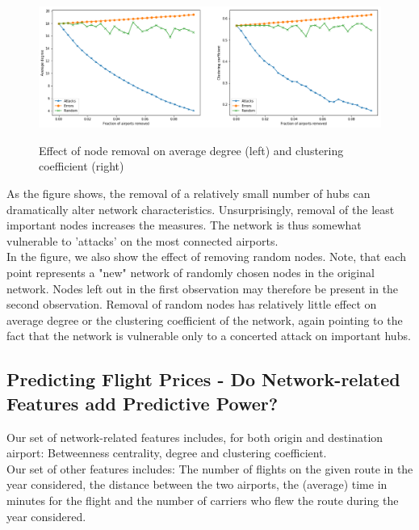 \begin{figure}[H]
  \centering
  \caption{Effect of node removal on average degree (left) and clustering coefficient (right)}
    \includegraphics[width=1. \textwidth]{Exam/Figures/attacksanderrors.png}
  \label{fig:attacks_and_errors}
\end{figure}
As the figure shows, the removal of a relatively small number of hubs can dramatically alter network characteristics. Unsurprisingly, removal of the least important nodes increases the measures. The network is thus somewhat vulnerable to 'attacks' on the most connected airports. \\ In the figure, we also show the effect of removing random nodes. Note, that each point represents a "new" network of randomly chosen nodes in the original network. Nodes left out in the first observation may therefore be present in the second observation.  Removal of random nodes has relatively little effect on average degree or the clustering coefficient of the network, again pointing to the fact that the network is vulnerable only to a concerted attack on important hubs. \\ 

\subsection{Predicting Flight Prices - Do Network-related Features add Predictive Power?}
Our set of network-related features includes, for both origin and destination airport: Betweenness centrality, degree and clustering coefficient. \\
Our set of other features includes: The number of flights on the given route in the year considered, the distance between the two airports, the (average) time in minutes for the flight and the number of carriers who flew the route during the year considered. \\

